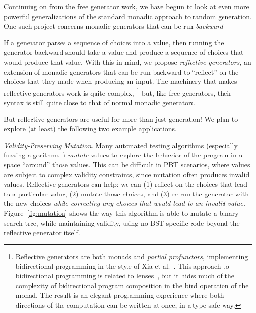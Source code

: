 Continuing on from the free generator work, we have begun to look at even more
powerful generalizations of the standard monadic approach to random generation.
One such project concerns monadic generators that can be run {\em backward}.

If a generator parses a sequence of choices into a value, then running the
generator backward should take a value and produce a sequence of choices that
would produce that value. With this in mind, we propose {\em reflective
generators}, an extension of monadic generators that can be run backward to
``reflect'' on the choices that they made when producing an input. The machinery
that makes reflective generators work is quite complex,%
\footnote{Reflective generators are both monads and {\em
    partial profunctors},
implementing bidirectional programming in the style of Xia et
al.~\cite{xia2019composing}. This approach to bidirectional programming is
related to lenses~\cite{foster2009bidirectional}, but it hides much of the
complexity of bidirectional program composition in the bind operation of the
monad. The result is an elegant programming experience where both directions of
the computation can be written at once, in a type-safe way.}
but, like free generators, their syntax is still quite close to that of normal
monadic generators.

But reflective generators are useful for more than just generation!
We plan to explore (at least) the following two example applications.

{\em Validity-Preserving Mutation.} Many automated testing algorithms
(especially fuzzing algorithms~\cite{afl-readme}) {\em mutate} values to explore
the behavior of the program in a space ``around'' those values. This can be
difficult in PBT scenarios, where values are subject to complex validity
constraints, since mutation often produces invalid values. Reflective
generators can help: we can (1) reflect on the choices that lead to a particular
value, (2) mutate those choices, and (3) re-run the generator with the new
choices {\em while correcting any choices that
would lead to an invalid value.} Figure~\ref{fig:mutation} shows the way this
algorithm is able to mutate a binary search tree, while maintaining validity,
using no BST-specific code beyond the reflective generator itself.

